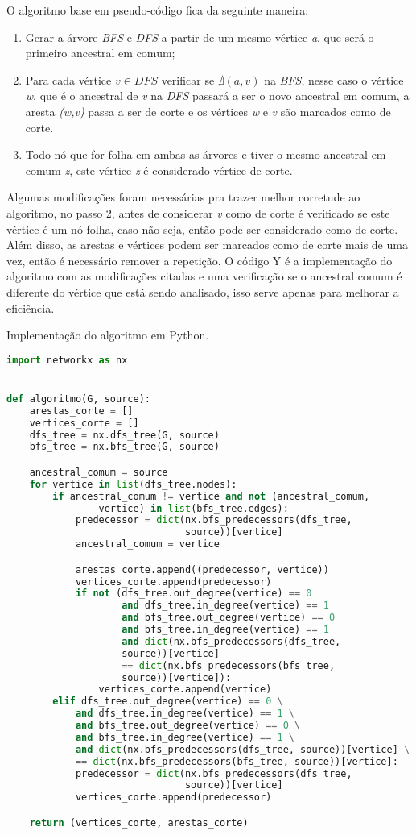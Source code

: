 \documentclass[
	article,
	12pt,
	openright,
	oneside,
	a4paper,
	english,
	french,
	spanish,
	brazil
	]{abntex2}
\begin{document}
O algoritmo base em pseudo-código fica da seguinte maneira:

\begin{enumerate}
\item Gerar a árvore \textit{BFS} e \textit{DFS} a partir de um mesmo vértice \textit{a}, que será o primeiro ancestral em comum;
\item Para cada vértice $v \in DFS$ verificar se $\nexists (a,v)$ na \textit{BFS},  nesse caso o vértice \textit{w}, que é o ancestral de \textit{v} na \textit{DFS} passará a ser o novo ancestral em comum, a aresta \textit{(w,v)} passa a ser de corte e os vértices \textit{w} e \textit{v} são marcados como de corte.
\item Todo nó que for folha em ambas as árvores e tiver o mesmo ancestral em comum \textit{z}, este vértice \textit{z} é considerado vértice de corte.
\end{enumerate}

Algumas modificações foram necessárias pra trazer melhor corretude ao algoritmo, no passo 2, antes de considerar \textit{v} como de corte é verificado se este vértice é um nó folha, caso não seja, então pode ser considerado como de corte. Além disso, as arestas e vértices podem ser marcados como de corte mais de uma vez, então é necessário remover a repetição. O código Y é a implementação do algoritmo com as modificações citadas e uma verificação se o ancestral comum é diferente do vértice que está sendo analisado, isso serve apenas para melhorar a eficiência.

Implementação do algoritmo em Python.
\begin{lstlisting}[language=python]
import networkx as nx


def algoritmo(G, source):
	arestas_corte = []
	vertices_corte = []
	dfs_tree = nx.dfs_tree(G, source)
	bfs_tree = nx.bfs_tree(G, source)

	ancestral_comum = source
	for vertice in list(dfs_tree.nodes):
		if ancestral_comum != vertice and not (ancestral_comum,
				vertice) in list(bfs_tree.edges):
			predecessor = dict(nx.bfs_predecessors(dfs_tree,
							   source))[vertice]
			ancestral_comum = vertice

			arestas_corte.append((predecessor, vertice))
			vertices_corte.append(predecessor)
			if not (dfs_tree.out_degree(vertice) == 0
					and dfs_tree.in_degree(vertice) == 1
					and bfs_tree.out_degree(vertice) == 0
					and bfs_tree.in_degree(vertice) == 1
					and dict(nx.bfs_predecessors(dfs_tree,
					source))[vertice]
					== dict(nx.bfs_predecessors(bfs_tree,
					source))[vertice]):
				vertices_corte.append(vertice)
		elif dfs_tree.out_degree(vertice) == 0 \
			and dfs_tree.in_degree(vertice) == 1 \
			and bfs_tree.out_degree(vertice) == 0 \
			and bfs_tree.in_degree(vertice) == 1 \
			and dict(nx.bfs_predecessors(dfs_tree, source))[vertice] \
			== dict(nx.bfs_predecessors(bfs_tree, source))[vertice]:
			predecessor = dict(nx.bfs_predecessors(dfs_tree,
							   source))[vertice]
			vertices_corte.append(predecessor)

	return (vertices_corte, arestas_corte)
\end{lstlisting}
\end{document}
